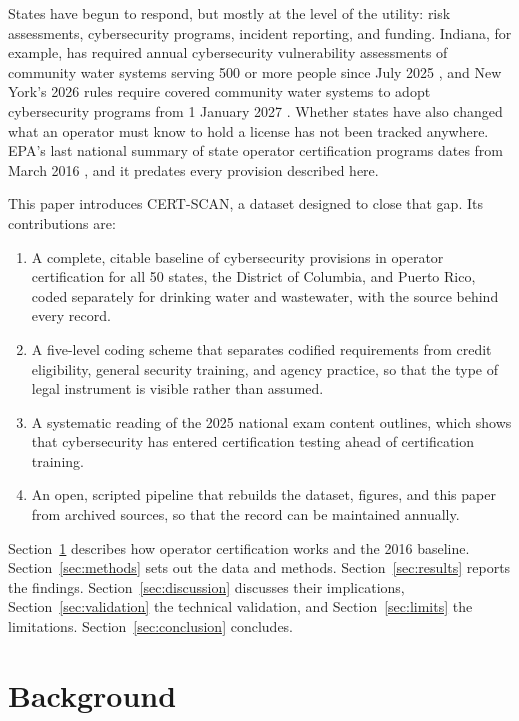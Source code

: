 \documentclass[10pt,twocolumn,letterpaper]{article}
\begin{document}
States have begun to respond, but mostly at the level of the utility: risk assessments, cybersecurity programs, incident reporting, and funding. Indiana, for example, has required annual cybersecurity vulnerability assessments of community water systems serving 500 or more people since July 2025 \cite{indiana}, and New York's 2026 rules require covered community water systems to adopt cybersecurity programs from 1 January 2027 \cite{nydoh}. Whether states have also changed what an operator must know to hold a license has not been tracked anywhere. EPA's last national summary of state operator certification programs dates from March 2016 \cite{epa2016}, and it predates every provision described here.

This paper introduces CERT-SCAN, a dataset designed to close that gap. Its contributions are:
\begin{enumerate}
\item A complete, citable baseline of cybersecurity provisions in operator certification for all 50 states, the District of Columbia, and Puerto Rico, coded separately for drinking water and wastewater, with the source behind every record.
\item A five-level coding scheme that separates codified requirements from credit eligibility, general security training, and agency practice, so that the type of legal instrument is visible rather than assumed.
\item A systematic reading of the 2025 national exam content outlines, which shows that cybersecurity has entered certification testing ahead of certification training.
\item An open, scripted pipeline that rebuilds the dataset, figures, and this paper from archived sources, so that the record can be maintained annually.
\end{enumerate}

Section~\ref{sec:background} describes how operator certification works and the 2016 baseline. Section~\ref{sec:methods} sets out the data and methods. Section~\ref{sec:results} reports the findings. Section~\ref{sec:discussion} discusses their implications, Section~\ref{sec:validation} the technical validation, and Section~\ref{sec:limits} the limitations. Section~\ref{sec:conclusion} concludes.

\section{Background}\label{sec:background}
\end{document}
